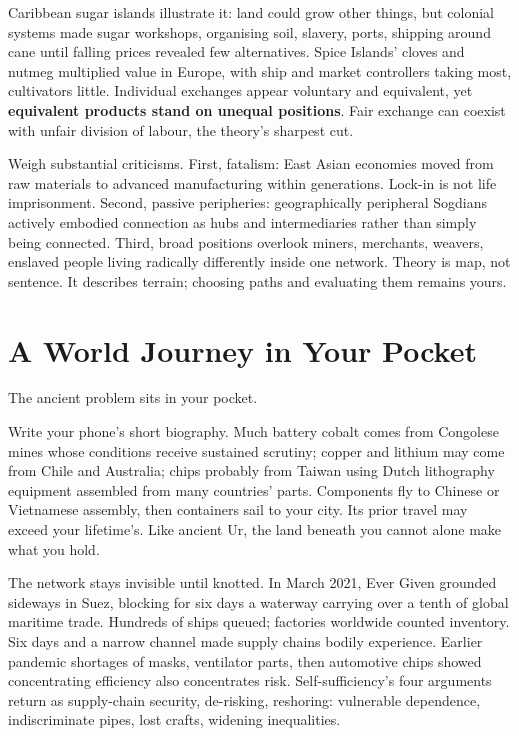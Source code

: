 Caribbean sugar islands illustrate it: land could grow other things, but colonial systems made sugar workshops, organising soil, slavery, ports, shipping around cane until falling prices revealed few alternatives. Spice Islands' cloves and nutmeg multiplied value in Europe, with ship and market controllers taking most, cultivators little. Individual exchanges appear voluntary and equivalent, yet \textbf{equivalent products stand on unequal positions}. Fair exchange can coexist with unfair division of labour, the theory's sharpest cut.

Weigh substantial criticisms. First, fatalism: East Asian economies moved from raw materials to advanced manufacturing within generations. Lock-in is not life imprisonment. Second, passive peripheries: geographically peripheral Sogdians actively embodied connection as hubs and intermediaries rather than simply being connected. Third, broad positions overlook miners, merchants, weavers, enslaved people living radically differently inside one network. Theory is map, not sentence. It describes terrain; choosing paths and evaluating them remains yours.

\section{A World Journey in Your Pocket}
The ancient problem sits in your pocket.

Write your phone's short biography. Much battery cobalt comes from Congolese mines whose conditions receive sustained scrutiny; copper and lithium may come from Chile and Australia; chips probably from Taiwan using Dutch lithography equipment assembled from many countries' parts. Components fly to Chinese or Vietnamese assembly, then containers sail to your city. Its prior travel may exceed your lifetime's. Like ancient Ur, the land beneath you cannot alone make what you hold.

The network stays invisible until knotted. In March 2021, Ever Given grounded sideways in Suez, blocking for six days a waterway carrying over a tenth of global maritime trade. Hundreds of ships queued; factories worldwide counted inventory. Six days and a narrow channel made supply chains bodily experience. Earlier pandemic shortages of masks, ventilator parts, then automotive chips showed concentrating efficiency also concentrates risk. Self-sufficiency's four arguments return as supply-chain security, de-risking, reshoring: vulnerable dependence, indiscriminate pipes, lost crafts, widening inequalities.


